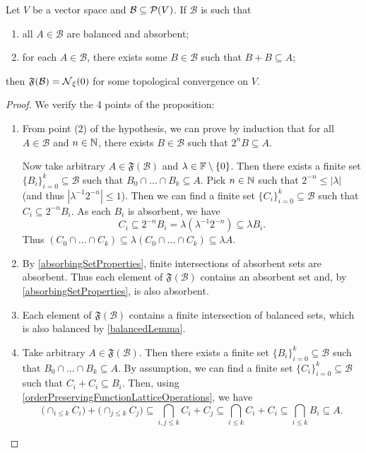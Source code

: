 \begin{corollary} \label{TVSbase}
Let $V$ be a vector space and $\mathcal{B}\subseteq\operatorname{\mathcal{P}}(V)$. If $\mathcal{B}$ is such that
\begin{enumerate}
\item all $A\in \mathcal{B}$ are balanced and absorbent;
\item for each $A\in\mathcal{B}$, there exists some $B\in \mathcal{B}$ such that $B+B\subseteq A$;
\end{enumerate}
then $\mathfrak{F}(\mathcal{B}) = \operatorname{\mathcal{N}}_\xi(0)$ for some topological convergence on $V$.
\end{corollary}
\begin{proof}
We verify the 4 points of the proposition:
\begin{enumerate}
\item From point (2) of the hypothesis, we can prove by induction that for all $A\in\mathcal{B}$ and $n\in \mathbb{N}$, there exists $B\in \mathcal{B}$ such that $2^nB \subseteq A$.

Now take arbitrary $A\in\mathfrak{F}(\mathcal{B})$ and $\lambda\in\mathbb{F}\setminus\{0\}$. Then there exists a finite set $\{B_i\}_{i=0}^k\subseteq \mathcal{B}$ such that $B_0\cap \ldots \cap B_k \subseteq A$. Pick $n\in\mathbb{N}$ such that $2^{-n}\leq |\lambda|$ (and thus $|\lambda^{-1}2^{-n}| \leq 1$). Then we can find a finite set $\{C_i\}_{i=0}^k\subseteq \mathcal{B}$ such that $C_i \subseteq 2^{-n}B_i$. As each $B_i$ is absorbent, we have
\[ C_i \subseteq 2^{-n}B_i = \lambda (\lambda^{-1}2^{-n}) \subseteq \lambda B_i. \]
Thus $(C_0\cap \ldots \cap C_k) \subseteq \lambda (C_0\cap \ldots \cap C_k) \subseteq \lambda A$.
\item By \ref{absorbingSetProperties}, finite intersections of absorbent sets are absorbent. Thus each element of $\mathfrak{F}(\mathcal{B})$ contains an absorbent set and, by \ref{absorbingSetProperties}, is also absorbent.
\item Each element of $\mathfrak{F}(\mathcal{B})$ contains a finite intersection of balanced sets, which is also balanced by \ref{balancedLemma}.
\item Take arbitrary $A\in\mathfrak{F}(\mathcal{B})$. Then there exists a finite set $\{B_i\}_{i=0}^k\subseteq \mathcal{B}$ such that $B_0\cap \ldots \cap B_k \subseteq A$. By assumption, we can find a finite set $\{C_i\}_{i=0}^k\subseteq \mathcal{B}$ such that $C_i + C_i \subseteq B_i$. Then, using \ref{orderPreservingFunctionLatticeOperations}, we have
\[ \Big(\cap_{i\leq k}C_i\Big) + \Big(\cap_{j\leq k}C_j\Big) \subseteq \bigcap_{i,j\leq k} C_i + C_j \subseteq \bigcap_{i\leq k}C_i + C_i \subseteq \bigcap_{i\leq k} B_i \subseteq A. \]
\end{enumerate}
\end{proof}



